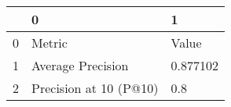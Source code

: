 \begin{tabular}{lll}
\toprule
{} &                       0 &         1 \\
\midrule
0 &                  Metric &     Value \\
1 &       Average Precision &  0.877102 \\
2 &  Precision at 10 (P@10) &       0.8 \\
\bottomrule
\end{tabular}
